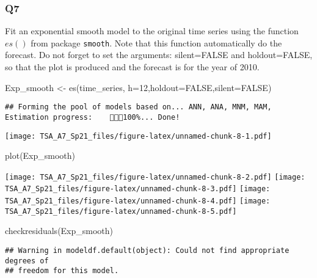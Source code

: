 \documentclass[
]{article}
\newenvironment{Shaded}{\begin{snugshade}}{\end{snugshade}}
\newcommand{\AttributeTok}[1]{\textcolor[rgb]{0.77,0.63,0.00}{#1}}
\newcommand{\ConstantTok}[1]{\textcolor[rgb]{0.00,0.00,0.00}{#1}}
\newcommand{\DecValTok}[1]{\textcolor[rgb]{0.00,0.00,0.81}{#1}}
\newcommand{\FunctionTok}[1]{\textcolor[rgb]{0.00,0.00,0.00}{#1}}
\newcommand{\NormalTok}[1]{#1}
\newcommand{\OtherTok}[1]{\textcolor[rgb]{0.56,0.35,0.01}{#1}}
\begin{document}
\hypertarget{q7}{%
\subsubsection{Q7}\label{q7}}

Fit an exponential smooth model to the original time series using the
function \(es()\) from package \texttt{smooth}. Note that this function
automatically do the forecast. Do not forget to set the arguments:
silent=FALSE and holdout=FALSE, so that the plot is produced and the
forecast is for the year of 2010.

\begin{Shaded}
\begin{Highlighting}[]
\NormalTok{Exp\_smooth }\OtherTok{\textless{}{-}} \FunctionTok{es}\NormalTok{(time\_series, }\AttributeTok{h=}\DecValTok{12}\NormalTok{,}\AttributeTok{holdout=}\ConstantTok{FALSE}\NormalTok{,}\AttributeTok{silent=}\ConstantTok{FALSE}\NormalTok{)}
\end{Highlighting}
\end{Shaded}

\begin{verbatim}
## Forming the pool of models based on... ANN, ANA, MNM, MAM, Estimation progress:    100%... Done!
\end{verbatim}

\texttt{[image: TSA\_A7\_Sp21\_files/figure-latex/unnamed-chunk-8-1.pdf]}

\begin{Shaded}
\begin{Highlighting}[]
\FunctionTok{plot}\NormalTok{(Exp\_smooth)}
\end{Highlighting}
\end{Shaded}

\texttt{[image: TSA\_A7\_Sp21\_files/figure-latex/unnamed-chunk-8-2.pdf]}
\texttt{[image: TSA\_A7\_Sp21\_files/figure-latex/unnamed-chunk-8-3.pdf]}
\texttt{[image: TSA\_A7\_Sp21\_files/figure-latex/unnamed-chunk-8-4.pdf]}
\texttt{[image: TSA\_A7\_Sp21\_files/figure-latex/unnamed-chunk-8-5.pdf]}

\begin{Shaded}
\begin{Highlighting}[]
\FunctionTok{checkresiduals}\NormalTok{(Exp\_smooth)}
\end{Highlighting}
\end{Shaded}

\begin{verbatim}
## Warning in modeldf.default(object): Could not find appropriate degrees of
## freedom for this model.
\end{verbatim}
\end{document}
